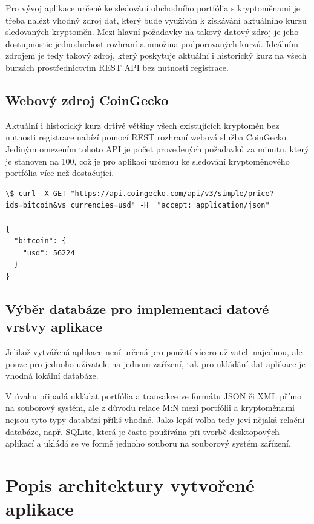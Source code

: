 \documentclass[12pt, a4paper]{article}
\let\oldsection\section
\renewcommand\section{\clearpage\oldsection}
\begin{document}
Pro vývoj aplikace určené ke sledování obchodního portfólia s kryptoměnami je třeba nalézt vhodný zdroj dat, který bude využíván k získávání aktuálního kurzu sledovaných kryptoměn. Mezi hlavní požadavky na takový datový zdroj je jeho dostupnostie jednoduchost rozhraní a množina podporovaných kurzů. Ideálním zdrojem je tedy takový zdroj, který poskytuje aktuální i historický kurz na všech burzách prostřednictvím REST API bez nutnosti registrace.

\subsection{Webový zdroj CoinGecko}
Aktuální i historický kurz drtivé většiny všech existujících kryptoměn bez nutnosti registrace nabízí pomocí REST rozhraní webová služba CoinGecko\cite{coingecko2021}. Jediným omezením tohoto API je počet provedených požadavků za minutu, který je stanoven na 100, což je pro aplikaci určenou ke sledování kryptoměnového portfólia více než dostačující.

\begin{lstlisting}
\$ curl -X GET "https://api.coingecko.com/api/v3/simple/price?ids=bitcoin&vs_currencies=usd" -H  "accept: application/json"

{
  "bitcoin": {
    "usd": 56224
  }
}
\end{lstlisting}

\subsection{Výběr databáze pro implementaci datové vrstvy aplikace}

Jelikož vytvářená aplikace není určená pro použití vícero uživateli najednou, ale pouze pro jednoho uživatele na jednom zařízení, tak pro ukládání dat aplikace je vhodná lokální databáze. 

V úvahu připadá ukládat portfólia a transakce ve formátu JSON či XML přímo na souborový systém, ale z důvodu relace M:N mezi portfólii a kryptoměnami nejsou tyto typy databází příliš vhodné. Jako lepší volba tedy jeví nějaká relační databáze, např. SQLite, která je často používána při tvorbě desktopových aplikací a ukládá se ve formě jednoho souboru na souborový systém zařízení.



\section{Popis architektury vytvořené aplikace}
\end{document}
